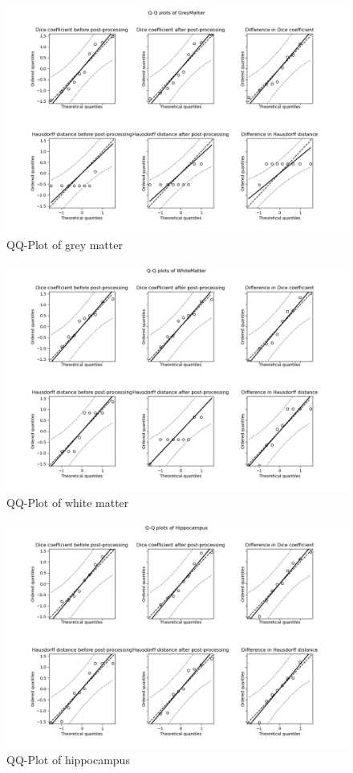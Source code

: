 \documentclass[journal]{IEEEtran}
\begin{document}
\begin{figure}[hb]
\centering
\includegraphics[width=5.6in]{img/QQ_plots_PKF/GreyMatter.png}
\caption{QQ-Plot of grey matter}
\label{fig_qq_gm}
\end{figure}

\begin{figure}[ht]
\centering
\includegraphics[width=5.6in]{img/QQ_plots_PKF/WhiteMatter.png}
\caption{QQ-Plot of white matter}
\label{fig_qq_wm}
\end{figure}

\begin{figure}[ht]
\centering
\includegraphics[width=5.6in]{img/QQ_plots_PKF/Hippocampus.png}
\caption{QQ-Plot of hippocampus}
\label{fig_qq_h}
\end{figure}
\end{document}
